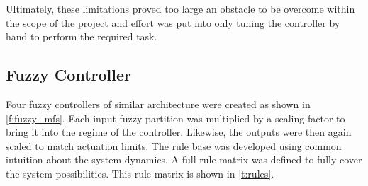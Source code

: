 Ultimately, these limitations proved too large an obstacle to be overcome within the scope of the project and
effort was put into only tuning the controller by hand to perform the required task.


\subsection{Fuzzy Controller}
Four fuzzy controllers of similar architecture were created as shown in \cref{f:fuzzy_mfs}.
Each input fuzzy partition was multiplied by a scaling factor to bring it into the regime of the controller.
Likewise, the outputs were then again scaled to match actuation limits. The rule base was developed using
common intuition about the system dynamics. A full rule matrix was defined to fully cover the system
possibilities. This rule matrix is shown in \cref{t:rules}.
